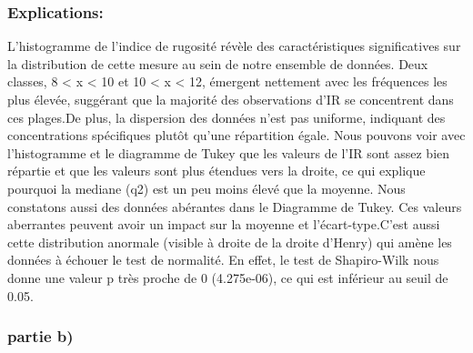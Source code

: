 \documentclass[
]{article}
\begin{document}
\hypertarget{explications}{%
\subsubsection{Explications:}\label{explications}}

L'histogramme de l'indice de rugosité révèle des caractéristiques
significatives sur la distribution de cette mesure au sein de notre
ensemble de données. Deux classes, 8 \textless{} x \textless{} 10 et 10
\textless{} x \textless{} 12, émergent nettement avec les fréquences les
plus élevée, suggérant que la majorité des observations d'IR se
concentrent dans ces plages.De plus, la dispersion des données n'est pas
uniforme, indiquant des concentrations spécifiques plutôt qu'une
répartition égale. Nous pouvons voir avec l'histogramme et le diagramme
de Tukey que les valeurs de l'IR sont assez bien répartie et que les
valeurs sont plus étendues vers la droite, ce qui explique pourquoi la
mediane (q2) est un peu moins élevé que la moyenne. Nous constatons
aussi des données abérantes dans le Diagramme de Tukey. Ces valeurs
aberrantes peuvent avoir un impact sur la moyenne et l'écart-type.C'est
aussi cette distribution anormale (visible à droite de la droite
d'Henry) qui amène les données à échouer le test de normalité. En effet,
le test de Shapiro-Wilk nous donne une valeur p très proche de 0
(4.275e-06), ce qui est inférieur au seuil de 0.05.

\hypertarget{partie-b}{%
\subsubsection{partie b)}\label{partie-b}}
\end{document}
